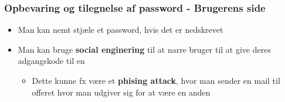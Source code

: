 \documentclass[a4, english]{article}
\begin{document}
\subsubsection{Opbevaring og tilegnelse af password - Brugerens side}
\begin{itemize}
	\item Man kan nemt stjæle et password, hvis det er nedskrevet 
  \item Man kan bruge \textbf{social enginering} til at narre bruger til at give deres adgangskode til en
  \begin{itemize}
  	\item Dette kunne fx være et \textbf{phising attack}, hvor man sender en mail til offeret hvor man udgiver sig for at være en anden
  \end{itemize}
\end{itemize}
\end{document}
